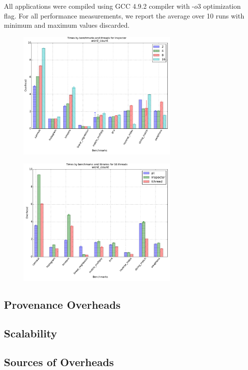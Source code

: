  All applications were compiled using GCC 4.9.2 compiler with -$o3$ optimization flag. For all performance measurements, we report the average over 10 runs with minimum and maximum values discarded.



\begin{figure}[h]
\includegraphics[width=8cm]{figure/benchmarks-inspector.pdf}
\end{figure}

\begin{figure}[h]
\includegraphics[width=8cm]{figure/benchmarks-16.pdf}
\end{figure}

%

\subsection{Provenance Overheads}



\subsection{\projecttitle Scalability}




\subsection{Sources of Overheads}




